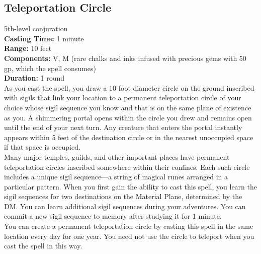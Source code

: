 \documentclass[11pt, A4paper, english]{article}
\begin{document}
		\subsection{Teleportation Circle}
5th-level conjuration \\
\textbf{Casting Time:} 1 minute \\
\textbf{Range:} 10 feet \\
\textbf{Components:} V, M (rare chalks and inks infused with precious gems with 50 gp, which the spell consumes) \\
\textbf{Duration:} 1 round \\
As you cast the spell, you draw a 10-foot-diameter circle on the ground inscribed with sigils that link your location to a permanent teleportation circle of your choice whose sigil sequence you know and that is on the same plane of existence as you. A shimmering portal opens within the circle you drew and remains open until the end of your next turn. Any creature that enters the portal instantly appears within 5 feet of the destination circle or in the nearest unoccupied space if that space is occupied. \\
Many major temples, guilds, and other important places have permanent teleportation circles inscribed somewhere within their confines. Each such circle includes a unique sigil sequence—a string of magical runes arranged in a particular pattern. When you first gain the ability to cast this spell, you learn the sigil sequences for two destinations on the Material Plane, determined by the DM. You can learn additional sigil sequences during your adventures. You can commit a new sigil sequence to memory after studying it for  1 minute. \\
You can create a permanent teleportation circle by casting this spell in the same location every day for one year. You need not use the circle to teleport when you cast the spell in this way.
\end{document}

